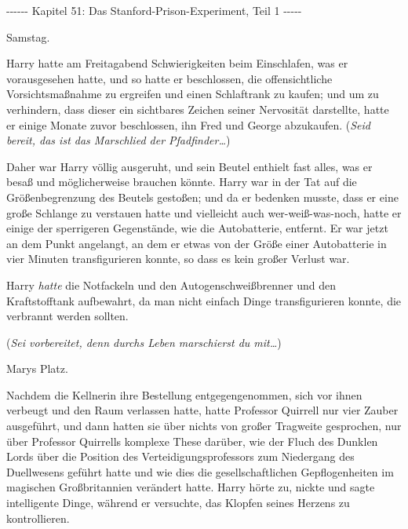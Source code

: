 

\hypertarget{das-stanford-prison-experiment-teil-1}{%

-\/-\/-\/-\/-\/- Kapitel 51: Das Stanford-Prison-Experiment, Teil 1 -\/-\/-\/-\/-

Samstag.

Harry hatte am Freitagabend Schwierigkeiten beim Einschlafen, was er vorausgesehen hatte, und so hatte er beschlossen, die offensichtliche Vorsichtsmaßnahme zu ergreifen und einen Schlaftrank zu kaufen; und um zu verhindern, dass dieser ein sichtbares Zeichen seiner Nervosität darstellte, hatte er einige Monate zuvor beschlossen, ihn Fred und George abzukaufen. (\emph{Seid bereit, das ist das Marschlied der Pfadfinder…})

Daher war Harry völlig ausgeruht, und sein Beutel enthielt fast alles, was er besaß und möglicherweise brauchen könnte. Harry war in der Tat auf die Größenbegrenzung des Beutels gestoßen; und da er bedenken musste, dass er eine große Schlange zu verstauen hatte und vielleicht auch wer-weiß-was-noch, hatte er einige der sperrigeren Gegenstände, wie die Autobatterie, entfernt. Er war jetzt an dem Punkt angelangt, an dem er etwas von der Größe einer Autobatterie in vier Minuten transfigurieren konnte, so dass es kein großer Verlust war.

Harry \emph{hatte} die Notfackeln und den Autogenschweißbrenner und den Kraftstofftank aufbewahrt, da man nicht einfach Dinge transfigurieren konnte, die verbrannt werden sollten.

(\emph{Sei vorbereitet, denn durchs Leben marschierst du mit…})

Marys Platz.

Nachdem die Kellnerin ihre Bestellung entgegengenommen, sich vor ihnen verbeugt und den Raum verlassen hatte, hatte Professor Quirrell nur vier Zauber ausgeführt, und dann hatten sie über nichts von großer Tragweite gesprochen, nur über Professor Quirrells komplexe These darüber, wie der Fluch des Dunklen Lords über die Position des Verteidigungsprofessors zum Niedergang des Duellwesens geführt hatte und wie dies die gesellschaftlichen Gepflogenheiten im magischen Großbritannien verändert hatte. Harry hörte zu, nickte und sagte intelligente Dinge, während er versuchte, das Klopfen seines Herzens zu kontrollieren.

}

